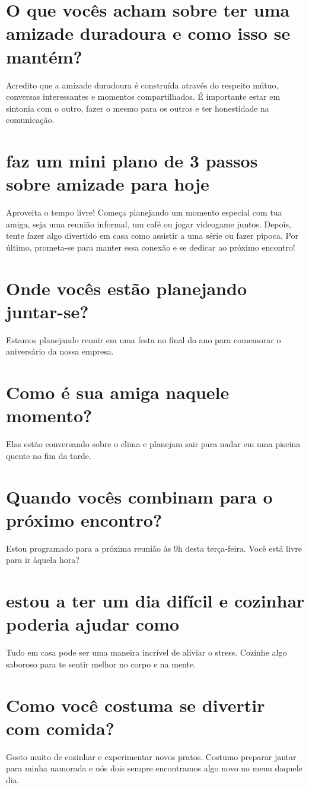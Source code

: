 \documentclass[11pt,a4paper]{article}
\begin{document}
\section{O que vocês acham sobre ter uma amizade duradoura e como isso se mantém?}
Acredito que a amizade duradoura é construída através do respeito mútuo, conversas interessantes e momentos compartilhados. É importante estar em sintonia com o outro, fazer o mesmo para os outros e ter honestidade na comunicação.

\section{faz um mini plano de 3 passos sobre amizade para hoje}
Aproveita o tempo livre! Começa planejando um momento especial com tua amiga, seja uma reunião informal, um café ou jogar videogame juntos. Depois, tente fazer algo divertido em casa como assistir a uma série ou fazer pipoca. Por último, prometa-se para manter essa conexão e se dedicar ao próximo encontro!

\section{Onde vocês estão planejando juntar-se?}
Estamos planejando reunir em uma festa no final do ano para comemorar o aniversário da nossa empresa.

\section{Como é sua amiga naquele momento?}
Elas estão conversando sobre o clima e planejam sair para nadar em uma piscina quente no fim da tarde.

\section{Quando vocês combinam para o próximo encontro?}
Estou programado para a próxima reunião às 9h desta terça-feira. Você está livre para ir àquela hora?

\section{estou a ter um dia difícil e cozinhar poderia ajudar como}
Tudo em casa pode ser uma maneira incrível de aliviar o stress. Cozinhe algo saboroso para te sentir melhor no corpo e na mente.

\section{Como você costuma se divertir com comida?}
Gosto muito de cozinhar e experimentar novos pratos. Costumo preparar jantar para minha namorada e nós dois sempre encontramos algo novo no menu daquele dia.
\end{document}
